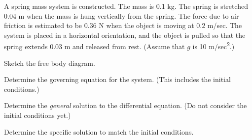 


  \begin{problem}

  \item A spring mass system is constructed. The mass is 0.1 kg. The
    spring is stretched 0.04 m when the mass is hung vertically from
    the spring. The force due to air friction is estimated to be 0.36
    N when the object is moving at 0.2 m/sec. The system is placed in
    a horizontal orientation, and the object is pulled so that the
    spring extends 0.03 m and released from rest. (Assume that $g$ is
    10 m/sec\textsuperscript{2}.)

    \begin{subproblem}
      \item Sketch the free body diagram.
        \vspace{4em}

      \item Determine the governing equation for the system. (This
        includes the initial conditions.)
        \vfill


      \item Determine the \textit{general} solution to the differential
        equation. (Do not consider the initial conditions yet.)
        \vfill

        \clearpage

      \item Determine the specific solution to match the initial conditions.

        \vfill

    \end{subproblem}



  \end{problem}


